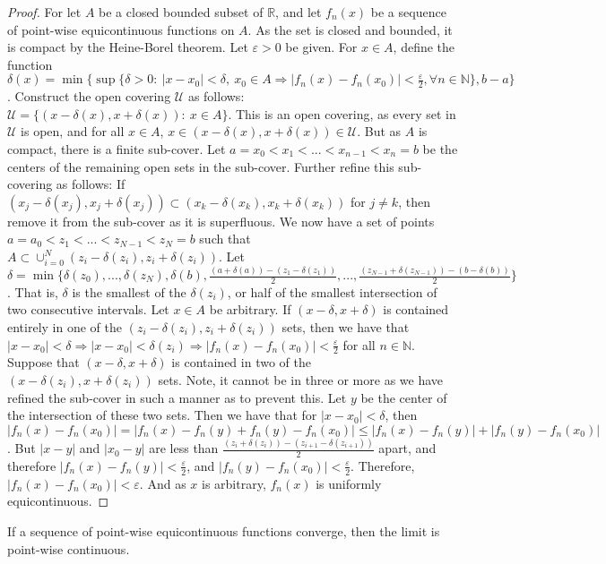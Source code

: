 \documentclass[crop=false,class=book]{standalone}
\begin{document}
\begin{proof}
For let $A$ be a closed bounded subset of $\mathbb{R}$, and let $f_n(x)$ be a sequence of point-wise equicontinuous functions on $A$. As the set is closed and bounded, it is compact by the Heine-Borel theorem. Let $\varepsilon>0$ be given. For $x\in A$, define the function $\delta(x) = \min\{\sup\{\delta>0:\ |x-x_0|<\delta,\ x_0\in A \Rightarrow |f_n(x)-f_n(x_0)|<\frac{\varepsilon}{2}, \forall n\in\mathbb{N}\},b-a\}$. Construct the open covering $\mathcal{U}$ as follows: $\mathcal{U} = \{(x-\delta(x),x+\delta(x)):\ x\in A\}$. This is an open covering, as every set in $\mathcal{U}$ is open, and for all $x\in A$, $x\in(x-\delta(x),x+\delta(x))\in\mathcal{U}$. But as $A$ is compact, there is a finite sub-cover. Let $a=x_0<x_1<...<x_{n-1}<x_n=b$ be the centers of the remaining open sets in the sub-cover. Further refine this sub-covering as follows: If $(x_j-\delta(x_j),x_j+\delta(x_j))\subset (x_k-\delta(x_k),x_k+\delta(x_k))$ for $j\ne k$, then remove it from the sub-cover as it is superfluous. We now have a set of points $a=a_0<z_1<...<z_{N-1}<z_N=b$ such that $A \subset \cup_{i=0}^{N} (z_i-\delta(z_i),z_i+\delta(z_i))$. Let $\delta = \min\{\delta(z_0),...,\delta(z_N),\delta(b), \frac{(a+\delta(a)) - (z_1-\delta(z_1))}{2}, ..., \frac{(z_{N-1} + \delta(z_{N-1})) - (b-\delta(b))}{2}\}$. That is, $\delta$ is the smallest of the $\delta(z_i)$, or half of the smallest intersection of two consecutive intervals. Let $x\in A$ be arbitrary. If $(x-\delta,x+\delta)$ is contained entirely in one of the $(z_i-\delta(z_i),z_i+\delta(z_i))$ sets, then we have that $|x-x_0|<\delta \Rightarrow |x-x_0| <\delta(z_i) \Rightarrow |f_n(x)-f_n(x_0)|<\frac{\varepsilon}{2}$ for all $n\in\mathbb{N}$. Suppose that $(x-\delta,x+\delta)$ is contained in two of the $(x-\delta(z_i),x+\delta(z_i))$ sets. Note, it cannot be in three or more as we have refined the sub-cover in such a manner as to prevent this. Let $y$ be the center of the intersection of these two sets. Then we have that for $|x-x_0|<\delta$, then $|f_n(x)-f_n(x_0)| = |f_n(x) - f_n(y) + f_n(y) - f_n(x_0)| \leq |f_n(x) - f_n(y)| + |f_n(y) - f_n(x_0)|$. But $|x-y|$ and $|x_0-y|$ are less than $\frac{(z_i + \delta(z_i))-(z_{i+1}-\delta(z_{i+1}))}{2}$ apart, and therefore $|f_n(x) - f_n(y)|<\frac{\varepsilon}{2}$, and $|f_n(y) - f_n(x_0)| < \frac{\varepsilon}{2}$. Therefore, $|f_n(x) - f_n(x_0)|<\varepsilon$. And as $x$ is arbitrary, $f_n(x)$ is uniformly equicontinuous.
\end{proof}
\begin{theorem} If a sequence of point-wise equicontinuous functions converge, then the limit is point-wise continuous.
\end{theorem}
\end{document}
